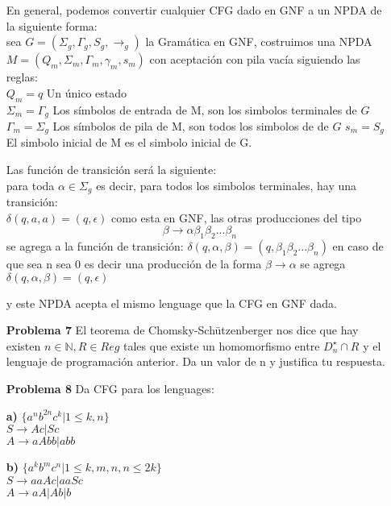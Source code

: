 \documentclass{article}
\begin{document}
\begin{enumerate}
En general, podemos convertir cualquier CFG dado en  GNF a un NPDA de la siguiente forma:\\

sea $G=(\Sigma_g,\Gamma_g,S_g,\rightarrow_g)$ la Gramática en GNF, 
costruimos una NPDA $M=(Q_m,\Sigma_m,\Gamma_m, \gamma_m,s_m)$ con aceptación con pila vacía siguiendo las reglas:\\
$Q_m={q}$ Un único estado\\
$\Sigma_m = \Gamma_g$ Los símbolos de entrada de M, son los simbolos terminales de $G$
$\Gamma_m = \Sigma_g$ Los símbolos de pila de M, son todos los simbolos de de $G$
$s_m = S_g$ El simbolo inicial de M es el simbolo inicial de G.

Las función de transición será la siguiente:\\
para toda $\alpha \in \Sigma_g$ es decir, para todos los simbolos terminales, hay una transición:\\
$\delta(q,a,a)=(q,\epsilon)$
como esta en GNF, las otras producciones del tipo $$\beta \rightarrow \alpha\beta_1\beta_2...\beta_n$$
se agrega a la función de transición:
$\delta(q,\alpha,\beta) = (q,\beta_1\beta_2...\beta_n)$
en caso de que sea n sea 0 es decir una producción de la forma $\beta \rightarrow \alpha$  se agrega $\delta(q,\alpha,\beta) = (q,\epsilon)$

y este NPDA acepta el mismo lenguage que la CFG en GNF dada.

\item[\bf{Problema 7}]  El teorema de Chomsky-Schützenberger nos dice que hay existen $n \in \mathbb{N}, R \in Reg$ tales que existe un homomorfismo entre $D^{\star}_n \cap R$ y el lenguaje de programación anterior. Da un valor de n y justifica tu respuesta.



\item[\bf{Problema 8}]  Da CFG para los lenguages:

\item[\bf{a)}]  $ \{a^{n}b^{2n}c^{k}| 1 \le k,n \}$\\
$S \rightarrow Ac|Sc $\\
$A \rightarrow aAbb|abb $

\item[\bf{b)}]  $ \{a^{k}b^{m}c^{n}| 1 \le k,m,n, n\le 2k\}$\\

$S \rightarrow aaAc|aaSc $\\
$A \rightarrow aA|Ab|b $\\


\end{enumerate}
\end{document}
